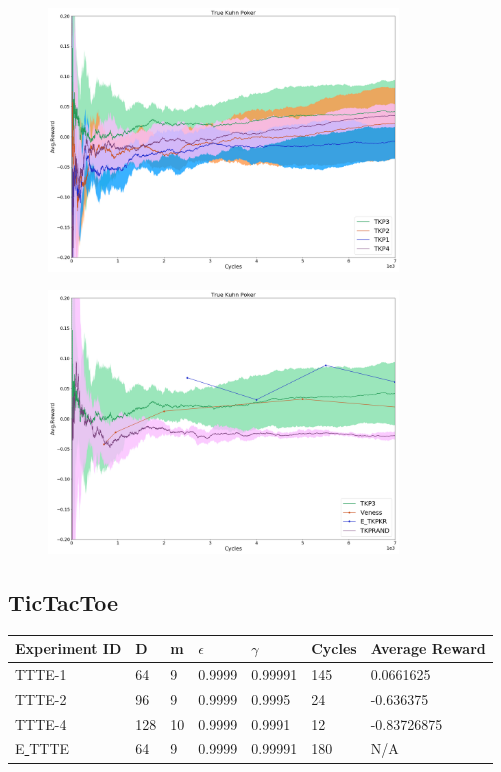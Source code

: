 \documentclass{article}
\theoremstyle{definition}
\newtheorem{primary statistics}[definition]{Primary Statistics}
\newtheorem{auxiliary statistics}[definition]{Auxiliary Statistics}
\begin{document}
 \begin{figure}[h]
 \centering
    \includegraphics[width=9.3cm]{4_True_Kuhn_Poker}
\end{figure}

 \begin{figure}[h]
 \centering
    \includegraphics[width=9.3cm]{True_Kuhn_Poker}
\end{figure}

\newpage

\subsection{TicTacToe}
\begin{tabular}{|l|l|l|l|l|l|l|}
 \hline \centering
 Experiment ID& D & m & $\epsilon$ & $\gamma$ & Cycles & Average Reward \\ \hline
TTTE-1   & 64        & 9           & 0.9999      & 0.99991           & 145    & 0.0661625         \\ \hline
TTTE-2   & 96        & 9           & 0.9999      & 0.9995            & 24     & -0.636375         \\ \hline
TTTE-4   & 128       & 10          & 0.9999      & 0.9991            & 12     & -0.83726875  \\  \hline  
E\underline{ }TTTE  & 64       & 9          & 0.9999      & 0.99991            & 180     & N/A  \\  \hline    
\end{tabular}
\end{document}

